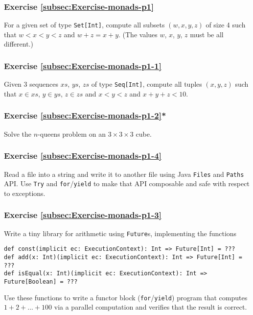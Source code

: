 \subsubsection{Exercise \label{subsec:Exercise-monads-p1}\ref{subsec:Exercise-monads-p1}}

For a given set of type \lstinline!Set[Int]!, compute all subsets
$\left(w,x,y,z\right)$ of size 4 such that $w<x<y<z$ and $w+z=x+y$.
(The values $w$, $x$, $y$, $z$ must be all different.)

\subsubsection{Exercise \label{subsec:Exercise-monads-p1-1}\ref{subsec:Exercise-monads-p1-1}}

Given 3 sequences $xs$, $ys$, $zs$ of type \lstinline!Seq[Int]!,
compute all tuples $\left(x,y,z\right)$ such that $x\in xs$, $y\in ys$,
$z\in zs$ and $x<y<z$ and $x+y+z<10$.

\subsubsection{Exercise \label{subsec:Exercise-monads-p1-2}\ref{subsec:Exercise-monads-p1-2}{*}}

Solve the $n$-queens problem on an $3\times3\times3$ cube.

\subsubsection{Exercise \label{subsec:Exercise-monads-p1-4}\ref{subsec:Exercise-monads-p1-4}}

Read a file into a string and write it to another file using Java
\lstinline!Files! and \lstinline!Paths! API. Use \lstinline!Try!
and \lstinline!for!/\lstinline!yield! to make that API composable
and safe with respect to exceptions.

\subsubsection{Exercise \label{subsec:Exercise-monads-p1-3}\ref{subsec:Exercise-monads-p1-3}}

Write a tiny library for arithmetic using \lstinline!Future!s, implementing
the functions
\begin{lstlisting}
def const(implicit ec: ExecutionContext): Int => Future[Int] = ???
def add(x: Int)(implicit ec: ExecutionContext): Int => Future[Int] = ???
def isEqual(x: Int)(implicit ec: ExecutionContext): Int => Future[Boolean] = ??? 
\end{lstlisting}
Use these functions to write a functor block (\lstinline!for!/\lstinline!yield!)
program that computes $1+2+...+100$ via a parallel computation and
verifies that the result is correct.


